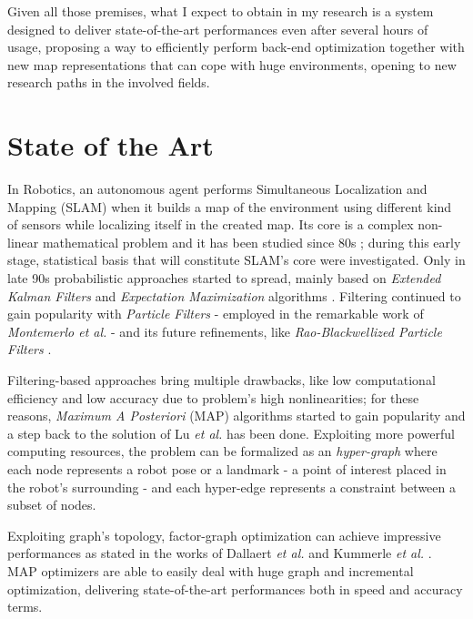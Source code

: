 \documentclass[10pt,a4paper, notitlepage]{report}
\begin{document}
\vspace{10px}

Given all those premises, what I expect to obtain in my research is a system designed to deliver state-of-the-art performances even after several hours of usage, proposing a way to efficiently perform back-end optimization together with new map representations that can cope with huge environments, opening to new research paths in the involved fields.


\section*{State of the Art}
In Robotics, an autonomous agent performs Simultaneous Localization and Mapping (SLAM) when it builds a map of the environment using different kind of sensors while localizing itself in the created map. Its core is a complex non-linear mathematical problem and it has been studied since 80s \cite{durrant2006simultaneous} \cite{bailey2006simultaneous}; during this early stage, statistical basis that will constitute SLAM's core were investigated. Only in late 90s probabilistic approaches started to spread, mainly based on \textit{Extended Kalman Filters} \cite{leonard1990dynamic} \cite{dissanayake2001solution} and \textit{Expectation Maximization} algorithms \cite{dellaert2003mcmc} \cite{thrun2001probabilistic}. Filtering continued to gain popularity with \textit{Particle Filters} - employed in the remarkable work of \textit{Montemerlo et al.} \cite{montemerlo2002fastslam} - and its future refinements, like \textit{Rao-Blackwellized Particle Filters} \cite{grisetti2005improving} \cite{carlone2010rao} \cite{tipaldi2007heterogeneous}.

Filtering-based approaches bring multiple drawbacks, like low computational efficiency and low accuracy due to problem's high nonlinearities; for these reasons, \textit{Maximum A Posteriori} (MAP) algorithms started to gain popularity and a step back to the solution of Lu \textit{et al.} \cite{lu1997globally} has been done. Exploiting more powerful computing resources, the problem can be formalized as an \textit{hyper-graph} where each node represents a robot pose or a landmark - a point of interest placed in the robot's surrounding - and each hyper-edge represents a constraint between a subset of nodes. 

Exploiting graph's topology, factor-graph optimization can achieve impressive performances as stated in the works of Dallaert \textit{et al.} \cite{dellaert2006square} and Kummerle \textit{et al.}  \cite{kummerle2011g}. MAP optimizers \cite{kummerle2011g} \cite{dellaert2012gtsam} \cite{ceres-solver} \cite{kaess2012isam2} are able to easily deal with huge graph and incremental optimization, delivering state-of-the-art performances both in speed and accuracy terms.
\end{document}
